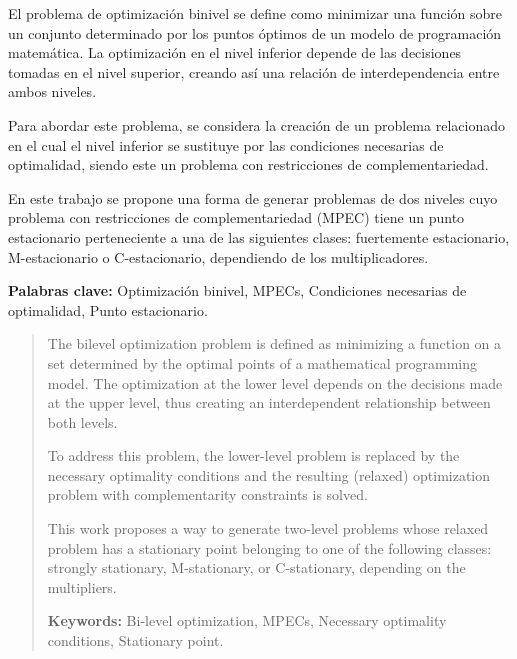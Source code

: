 \begin{resumen}
	El problema de optimización binivel se define como minimizar una función sobre un conjunto determinado por los puntos óptimos de un modelo de programación matemática. La optimización en el nivel inferior depende de las decisiones tomadas en el nivel superior, creando así una relación de interdependencia entre ambos niveles.

	Para abordar este problema, se considera la creación de un problema relacionado en el cual el nivel inferior se sustituye por las condiciones necesarias de optimalidad, siendo este un problema con restricciones de complementariedad.

	En este trabajo se propone una forma de generar problemas de dos niveles cuyo problema con restricciones de complementariedad (MPEC) tiene un punto estacionario perteneciente a una de las siguientes 
	clases: fuertemente estacionario, M-estacionario o C-estacionario, dependiendo de los multiplicadores.

	\textbf{Palabras clave:} Optimización binivel, MPECs, Condiciones necesarias de optimalidad, Punto estacionario.
\end{resumen}

\begin{abstract}
	The bilevel optimization problem is defined as minimizing a function on a set determined by the optimal points of a mathematical programming model. The optimization at the lower level depends on the decisions made at the upper level, thus creating an interdependent relationship between both levels.

	To address this problem, the lower-level problem is replaced by the necessary optimality conditions and the resulting (relaxed) optimization problem with complementarity constraints is solved.
	
	This work proposes a way to generate two-level problems whose relaxed problem has a stationary point belonging to one of the following classes: strongly stationary, M-stationary, or C-stationary, depending on the multipliers.
	
	\textbf{Keywords:} Bi-level optimization, MPECs, Necessary optimality conditions, Stationary point.

\end{abstract}
